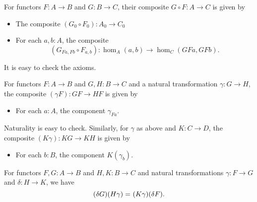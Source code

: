 \documentclass[hott-all.tex]{subfiles}
\begin{document}



\begin{defn}
  For functors $F:A\to B$ and $G:B\to C$, their composite $G\circ F:A\to C$ is given by
  \begin{itemize}
  \item The composite $(G_0\circ F_0) : A_0 \to C_0$
  \item For each $a,b:A$, the composite
    \[(G_{Fa,Fb}\circ F_{a,b}):\hom_A(a,b) \to \hom_C(GFa,GFb).\]
  \end{itemize}
  It is easy to check the axioms.
\end{defn}

\begin{defn}
  For functors $F:A\to B$ and $G,H:B\to C$ and a natural transformation $\gamma:G\to H$, the composite $(\gamma F):GF\to HF$ is given by
  \begin{itemize}
  \item For each $a:A$, the component $\gamma_{Fa}$.
  \end{itemize}
  Naturality is easy to check.
  Similarly, for $\gamma$ as above and $K:C\to D$, the composite $(K\gamma):KG\to KH$ is given by
  \begin{itemize}
  \item For each $b:B$, the component $K(\gamma_b)$.
  \end{itemize}
\end{defn}

\begin{lem}
  For functors $F,G:A\to B$ and $H,K:B\to C$ and natural transformations $\gamma:F\to G$ and $\delta:H\to K$, we have
  \[(\delta G)(H\gamma) =_{} (K\gamma)(\delta F).\]
\end{lem}
\end{document}
